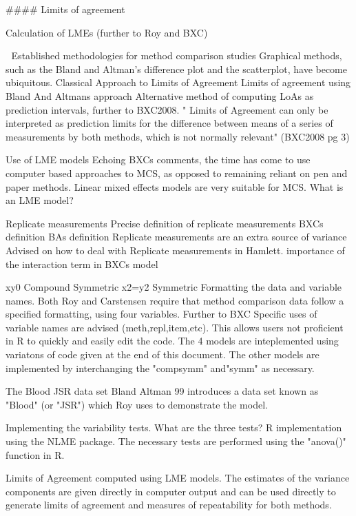 
 
#### Limits of agreement
 


Calculation of LMEs (further to Roy and BXC)
 
 Established methodologies for method comparison studies
Graphical methods, such as the Bland and Altman's difference plot and the scatterplot, have become ubiquitous.
Classical Approach to Limits of Agreement
Limits of agreement using Bland And Altmans approach
Alternative method of computing LoAs as prediction intervals, further to BXC2008.
" Limits of Agreement can only be interpreted as prediction limits for the difference between means of a series of measurements by both methods, which is not normally relevant" (BXC2008 pg 3)
 
Use of LME models
Echoing BXCs comments, the time has come to use computer based approaches to MCS, as opposed to remaining reliant on pen and paper methods.
Linear mixed effects models are very suitable for MCS.
What is an LME model?
 
Replicate measurements
Precise definition of replicate measurements
BXCs definition
BAs definition
Replicate measurements are an extra source of variance
Advised on how to deal with Replicate measurements in Hamlett. 
importance of the interaction term in BXCs model
 
               xy0
Compound Symmetric     	x2=y2
Symmetric                        
Formatting the data and variable names.
Both Roy and Carstensen require that method comparison data follow a specified formatting, using four variables.
Further to BXC Specific uses of variable names are advised (meth,repl,item,etc).
This allows users not proficient in R to quickly and easily edit the code.
The 4 models are inteplemented using variatons of code given at the end of this document.
The other models are implemented by interchanging the "compsymm" and"symm" as necessary.
 
The Blood JSR data set
Bland Altman 99 introduces a data set known as "Blood" (or "JSR") which Roy uses to demonstrate the model.
 
Implementing the variability tests.
What are the three tests?
R implementation using the NLME package. 
The necessary tests are performed using the "anova()" function in R. 
 
Limits of Agreement computed using LME models.
The estimates of the variance components are given directly in computer output and can be used directly to generate
limits of agreement and measures of repeatability for both methods.

